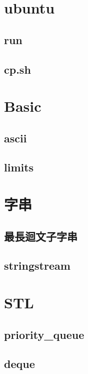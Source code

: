 \section{ubuntu}
    \subsection{run}
        
    \subsection{cp.sh}
        

\section{Basic}
    \subsection{ascii}
        
    \subsection{limits}
        

\section{字串}
    \subsection{最長迴文子字串}
        
    \subsection{stringstream}
        

\section{STL}
    \subsection{priority\_queue}
        
    \subsection{deque}
        
